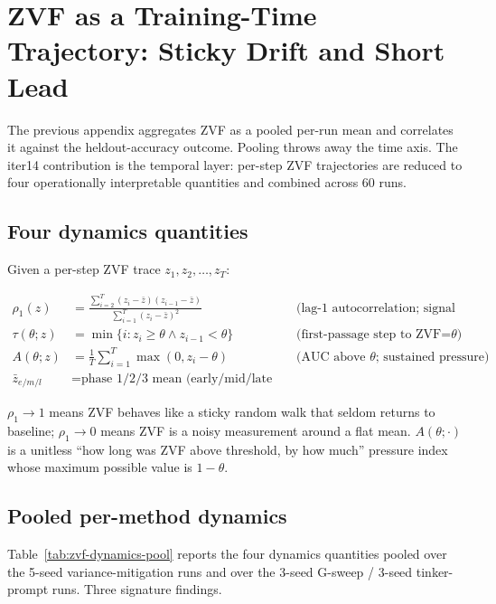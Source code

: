 \documentclass{article}
\begin{document}
\section{ZVF as a Training-Time Trajectory: Sticky Drift and Short Lead}
\label{sec:zvf-dynamics}

The previous appendix aggregates ZVF as a pooled per-run mean and
correlates it against the heldout-accuracy outcome. Pooling throws
away the time axis. The iter14 contribution is the temporal layer:
per-step ZVF trajectories are reduced to four
operationally interpretable quantities and combined across 60 runs.

\subsection{Four dynamics quantities}

Given a per-step ZVF trace $z_1, z_2, \dots, z_T$:

\begin{align}
  \rho_1(z) &= \frac{\sum_{i=2}^{T}(z_i-\bar z)(z_{i-1}-\bar z)}{\sum_{i=1}^{T}(z_i-\bar z)^2}
              &&\text{(lag-1 autocorrelation; signal stickiness)}\\
  \tau(\theta; z) &= \min\{i : z_i \ge \theta \wedge z_{i-1} < \theta\}
              &&\text{(first-passage step to ZVF=}\theta\text{)}\\
  A(\theta; z) &= \frac{1}{T}\sum_{i=1}^{T}\max(0, z_i - \theta)
              &&\text{(AUC above }\theta\text{; sustained pressure)}\\
  \bar z_{e/m/l} &= \text{phase 1/2/3 mean (early/mid/late thirds)}
\end{align}

$\rho_1 \to 1$ means ZVF behaves like a sticky random walk that
seldom returns to baseline; $\rho_1 \to 0$ means ZVF is a noisy
measurement around a flat mean. $A(\theta;\cdot)$ is a unitless
``how long was ZVF above threshold, by how much'' pressure index
whose maximum possible value is $1-\theta$.

\subsection{Pooled per-method dynamics}

Table~\ref{tab:zvf-dynamics-pool} reports the four dynamics quantities
pooled over the 5-seed variance-mitigation runs and over the 3-seed
G-sweep / 3-seed tinker-prompt runs. Three signature findings.
\end{document}
